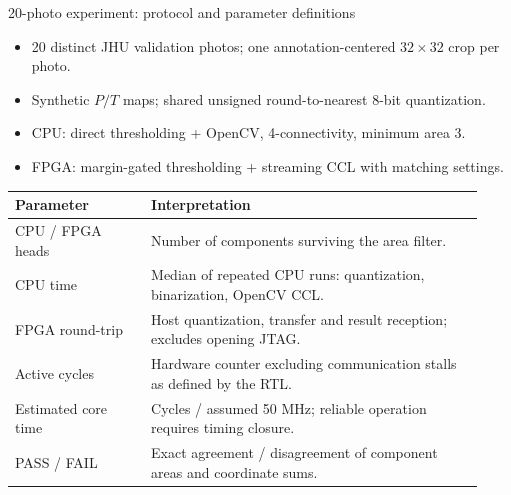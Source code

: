 \documentclass[aspectratio=169,10pt]{beamer}
\begin{document}
\begin{frame}{20-photo experiment: protocol and parameter definitions}
\small
\begin{itemize}
\item 20 distinct JHU validation photos; one annotation-centered $32\times32$ crop per photo.
\item Synthetic $P/T$ maps; shared unsigned round-to-nearest 8-bit quantization.
\item CPU: direct thresholding + OpenCV, 4-connectivity, minimum area 3.
\item FPGA: margin-gated thresholding + streaming CCL with matching settings.
\end{itemize}
\begin{tabular}{p{0.27\linewidth}p{0.66\linewidth}}
\toprule
Parameter & Interpretation \\
\midrule
CPU / FPGA heads & Number of components surviving the area filter. \\
CPU time & Median of repeated CPU runs: quantization, binarization, OpenCV CCL. \\
FPGA round-trip & Host quantization, transfer and result reception; excludes opening JTAG. \\
Active cycles & Hardware counter excluding communication stalls as defined by the RTL. \\
Estimated core time & Cycles / assumed 50 MHz; reliable operation requires timing closure. \\
PASS / FAIL & Exact agreement / disagreement of component areas and coordinate sums. \\
\bottomrule
\end{tabular}
\end{frame}
\end{document}

